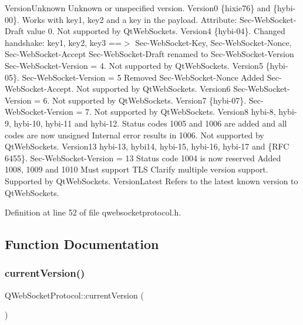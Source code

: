 Version\+Unknown Unknown or unspecified version.  Version0 \{hixie76\} and \{hybi-\/00\}. Works with key1, key2 and a key in the payload. Attribute\+: Sec-\/\+Web\+Socket-\/\+Draft value 0. Not supported by Qt\+Web\+Sockets.  Version4 \{hybi-\/04\}. Changed handshake\+: key1, key2, key3 ==$>$ Sec-\/\+Web\+Socket-\/\+Key, Sec-\/\+Web\+Socket-\/\+Nonce, Sec-\/\+Web\+Socket-\/\+Accept Sec-\/\+Web\+Socket-\/\+Draft renamed to Sec-\/\+Web\+Socket-\/\+Version Sec-\/\+Web\+Socket-\/\+Version = 4. Not supported by Qt\+Web\+Sockets.  Version5 \{hybi-\/05\}. Sec-\/\+Web\+Socket-\/\+Version = 5 Removed Sec-\/\+Web\+Socket-\/\+Nonce Added Sec-\/\+Web\+Socket-\/\+Accept. Not supported by Qt\+Web\+Sockets.  Version6 Sec-\/\+Web\+Socket-\/\+Version = 6. Not supported by Qt\+Web\+Sockets.  Version7 \{hybi-\/07\}. Sec-\/\+Web\+Socket-\/\+Version = 7. Not supported by Qt\+Web\+Sockets.  Version8 hybi-\/8, hybi-\/9, hybi-\/10, hybi-\/11 and hybi-\/12. Status codes 1005 and 1006 are added and all codes are now unsigned Internal error results in 1006. Not supported by Qt\+Web\+Sockets.  Version13 hybi-\/13, hybi14, hybi-\/15, hybi-\/16, hybi-\/17 and \{R\+FC 6455\}. Sec-\/\+Web\+Socket-\/\+Version = 13 Status code 1004 is now reserved Added 1008, 1009 and 1010 Must support T\+LS Clarify multiple version support. Supported by Qt\+Web\+Sockets.  Version\+Latest Refers to the latest known version to Qt\+Web\+Sockets. 

Definition at line 52 of file qwebsocketprotocol.\+h.



\subsection{Function Documentation}
\mbox{\label{namespace_q_web_socket_protocol_a4f5541729d50349cf34835b5080abe18}} 
\subsubsection{\texorpdfstring{current\+Version()}{currentVersion()}}
{\footnotesize\ttfamily Q\+Web\+Socket\+Protocol\+::current\+Version (\begin{DoxyParamCaption}{ }\end{DoxyParamCaption})\hspace{0.3cm}{\ttfamily [inline]}}

